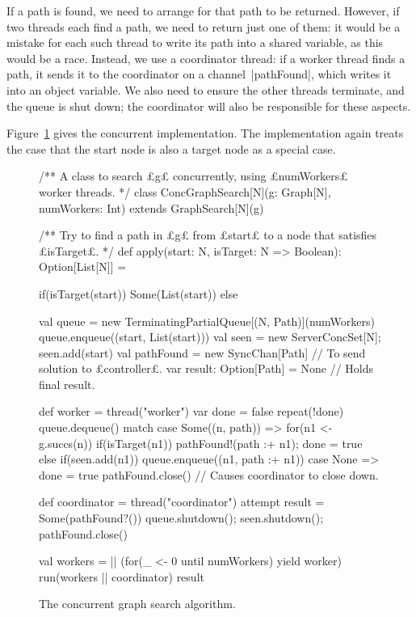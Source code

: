 If a path is found, we need to arrange for that path to be returned. However,
if two threads each find a path, we need to return just one of them: it would
be a mistake for each such thread to write its path into a shared variable, as
this would be a race.  Instead, we use a coordinator thread: if a worker
thread finds a path, it sends it to the coordinator on a channel~|pathFound|,
which writes it into an object variable.  We also need to ensure the other
threads terminate, and the queue is shut down; the coordinator will also be
responsible for these aspects.

Figure~\ref{fig:graph-search-conc} gives the concurrent implementation.  The
implementation again treats the case that the start node is also a target node
as a special case. 



\begin{figure}
\begin{scala}
/** A class to search £g£ concurrently, using £numWorkers£ worker threads. */
class ConcGraphSearch[N](g: Graph[N], numWorkers: Int) 
    extends GraphSearch[N](g){
  /** Try to find a path in £g£ from £start£ to a node that satisfies £isTarget£. */
  def apply(start: N, isTarget: N => Boolean): Option[List[N]] = {
    if(isTarget(start)) Some(List(start))
    else{
      val queue = new TerminatingPartialQueue[(N, Path)](numWorkers)
      queue.enqueue((start, List(start)))
      val seen = new ServerConcSet[N]; seen.add(start)
      val pathFound = new SyncChan[Path] // To send solution to £controller£.
      var result: Option[Path] = None // Holds final result. 

      def worker = thread("worker"){
        var done = false
        repeat(!done){
          queue.dequeue() match{
            case Some((n, path)) =>
              for(n1 <- g.succs(n)){
                if(isTarget(n1)){ pathFound!(path :+ n1); done = true } 
                else if(seen.add(n1)) queue.enqueue((n1, path :+ n1))
              }
            case None => done = true
          }
        }
        pathFound.close() // Causes coordinator to close down.
      }

      def coordinator = thread("coordinator"){
        attempt{ result = Some(pathFound?()) }{ }
        queue.shutdown(); seen.shutdown(); pathFound.close()
      }

      val workers = || (for(_ <- 0 until numWorkers) yield worker)
      run(workers || coordinator)
      result
    }
  }
}
\end{scala}
\caption{The concurrent graph search algorithm.}
\label{fig:graph-search-conc}
\end{figure}


